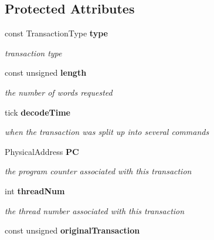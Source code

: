 \subsection*{Protected Attributes}
\begin{DoxyCompactItemize}
\item 
const TransactionType {\bf type}\label{class_d_r_a_msim_i_i_1_1_transaction_a8d8b784a0f82bfc5fed936d335d2d786}

\begin{DoxyCompactList}\small\item\em transaction type \item\end{DoxyCompactList}\item 
const unsigned {\bf length}\label{class_d_r_a_msim_i_i_1_1_transaction_ab902d44749de4defc083b7538e05182a}

\begin{DoxyCompactList}\small\item\em the number of words requested \item\end{DoxyCompactList}\item 
tick {\bf decodeTime}\label{class_d_r_a_msim_i_i_1_1_transaction_a38069cc0a59d1b13b7f2cfced6ab0d48}

\begin{DoxyCompactList}\small\item\em when the transaction was split up into several commands \item\end{DoxyCompactList}\item 
PhysicalAddress {\bf PC}\label{class_d_r_a_msim_i_i_1_1_transaction_ad9d99dfe661ea94e0eaaab4b417b1469}

\begin{DoxyCompactList}\small\item\em the program counter associated with this transaction \item\end{DoxyCompactList}\item 
int {\bf threadNum}\label{class_d_r_a_msim_i_i_1_1_transaction_ad7881887e5ad330b281f4a5a196a8822}

\begin{DoxyCompactList}\small\item\em the thread number associated with this transaction \item\end{DoxyCompactList}\item 
const unsigned {\bf originalTransaction}\label{class_d_r_a_msim_i_i_1_1_transaction_a7ca48ffef86da91fa3acfe4dda88f922}


\end{DoxyCompactItemize}
